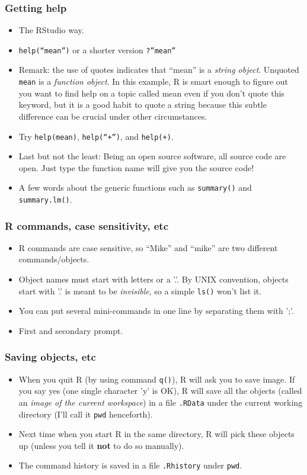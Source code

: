 \begin{frame}
  \frametitle{Getting help}
  \begin{itemize}
  \item The RStudio way.
  \item \texttt{help(``mean'')} or a shorter version \texttt{?''mean''}
  \item Remark: the use of quotes indicates that ``mean'' is a
    \emph{string object}.  Unquoted \texttt{mean} is a \emph{function
      object}.  In this example, R is smart enough to figure out you
    want to find help on a topic called mean even if you don't quote
    this keyword, but it is a good habit to quote a string because
    this subtle difference can be crucial under other circumstances.
  \item Try \texttt{help(mean)}, \texttt{help(``+'')}, and
    \texttt{help(+)}.
  \item Last but not the least: Being an open source software, all
    source code are open. Just type the function name will give you
    the source code!
  \item A few words about the generic functions such as
    \texttt{summary()} and \texttt{summary.lm()}.
  \end{itemize}
\end{frame}

\begin{frame}
  \frametitle{R commands, case sensitivity, etc}
  \begin{itemize}
  \item R commands are case sensitive, so ``Mike'' and ``mike'' are
    two different commands/objects.
  \item Object names must start with letters or a '.'.  By UNIX
    convention, objects start with '.' is meant to be
    \emph{invisible}, so a simple \texttt{ls()} won't list it.
  \item You can put several mini-commands in one line by separating
    them with ';'.
  \item First and secondary prompt.
  \end{itemize}
\end{frame}

\begin{frame}
  \frametitle{Saving objects, etc}
  \begin{itemize}
  \item When you quit R (by using command \texttt{q()}), R will ask
    you to save image.  If you say yes (one single character 'y' is
    OK), R will save all the objects (called an \emph{image of the
      current workspace}) in a file \texttt{.RData} under the current
    working directory (I'll call it \texttt{pwd} henceforth).
  \item Next time when you start R in the same directory, R will pick
    these objects up (unless you tell it \textbf{not} to do so
    manually).
  \item The command history is saved in a file \texttt{.Rhistory}
    under \texttt{pwd}.
  \end{itemize}
\end{frame}

